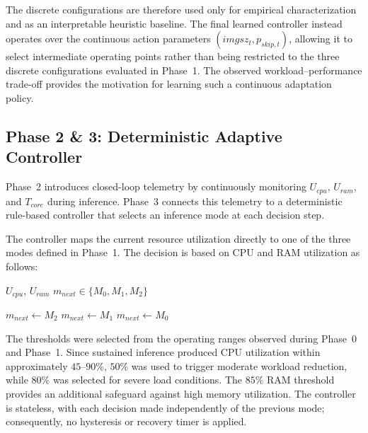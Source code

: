 \documentclass{ieeeaccess}
\begin{document}
The discrete configurations are therefore used only for empirical
characterization and as an interpretable heuristic baseline. The final
learned controller instead operates over the continuous action parameters
$(imgsz_t,p_{skip,t})$, allowing it to select intermediate operating points
rather than being restricted to the three discrete configurations evaluated
in Phase~1. The observed workload--performance trade-off provides the
motivation for learning such a continuous adaptation policy.


\subsection{Phase 2 \& 3: Deterministic Adaptive Controller}

Phase~2 introduces closed-loop telemetry by continuously monitoring
$U_{cpu}$, $U_{ram}$, and $T_{core}$ during inference. Phase~3 connects
this telemetry to a deterministic rule-based controller that selects an
inference mode at each decision step.

The controller maps the current resource utilization directly to one of the
three modes defined in Phase~1. The decision is based on CPU and RAM
utilization as follows:

\begin{algorithm}[H]
\caption{Deterministic Adaptive Controller}
\label{alg:heuristic}
\begin{algorithmic}[1]
\Require $U_{cpu}$, $U_{ram}$
\Ensure $m_{next} \in \{M_0,M_1,M_2\}$

    \State $m_{next}\gets M_2$ 
    \State $m_{next}\gets M_1$ 
\Else
    \State $m_{next}\gets M_0$ 
\EndIf
\end{algorithmic}
\end{algorithm}

The thresholds were selected from the operating ranges observed during
Phase~0 and Phase~1. Since sustained inference produced CPU utilization
within approximately $45$--$90\%$, $50\%$ was used to trigger moderate
workload reduction, while $80\%$ was selected for severe load conditions.
The $85\%$ RAM threshold provides an additional safeguard against high
memory utilization. The controller is stateless, with each decision made
independently of the previous mode; consequently, no hysteresis or recovery
timer is applied.
\end{document}
